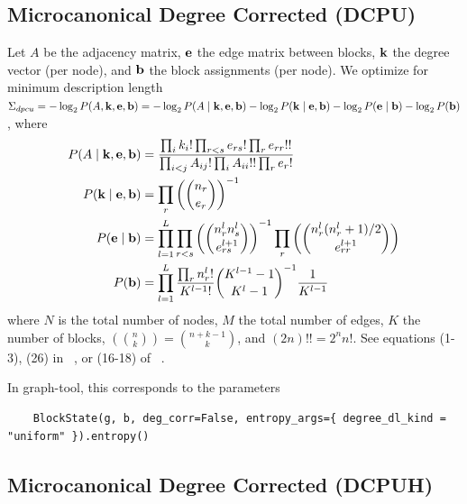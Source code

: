 \documentclass[aps,pre,superscriptaddress]{article}
\begin{document}
\subsection{Microcanonical Degree Corrected (DCPU)}

Let $A$ be the adjacency matrix, $\vb{e}$ the edge matrix between blocks, $\vb{k}$ the degree vector (per node), and $\vb{b}$ the block assignments (per node).
We optimize for minimum description length $\Sigma_{dpcu} = -\log_2P(A, \vb{k}, \vb{e}, \vb{b}) = -\log_2P(A \mid \vb{k}, \vb{e}, \vb{b}) - \log_2 P(\vb{k} \mid \vb{e}, \vb{b}) - \log_2 P(\vb{e} \mid \vb{b}) - \log_2 P(\vb{b}) $, where
\begin{align}
	P(A \mid \vb{k}, \vb{e}, \vb{b}) & = \frac{ \prod_i k_i! \prod_{r < s} e_{rs}! \prod_{r} e_{rr}!!} {\prod_{i < j} A_{ij}! \prod_i A_{ii}!! \prod_r e_r!}                                      \\
	P(\vb{k} \mid \vb{e}, \vb{b})    & = \prod_r \left( \binom{n_r}{e_r} \right)^{-1}                                                                                                             \\
	P(\vb{e} \mid \vb{b})            & = \prod_{l=1}^{L} \prod_{r < s} \left( \binom{n_r^l n_s^l}{e_{rs}^{l+1}} \right)^{-1} \prod_r \left( \binom{ n_r^l (n_r^l + 1) / 2 }{e_{rr}^{l+1} }\right) \\
	P(\vb{b})                        & = \prod_{l=1}^L \frac{\prod_r n_r^l!}{K^{l-1}!} \binom{ K^{l-1} - 1}{K^l - 1}^{-1} \frac{1}{K^{l-1}}
\end{align}
where $N$ is the total number of nodes, $M$ the total number of edges, $K$ the number of blocks, $\left( \binom{n}{k} \right) = \binom{n + k - 1}{k}$, and $(2n)!! = 2^n n!$.
See equations (1-3), (26) in ~\cite{peixoto17-01}, or (16-18) of ~\cite{funke19-04}.

In graph-tool, this corresponds to the parameters
\begin{verbatim}
    BlockState(g, b, deg_corr=False, entropy_args={ degree_dl_kind = "uniform" }).entropy()
\end{verbatim}

\subsection{Microcanonical Degree Corrected (DCPUH)}
\end{document}
